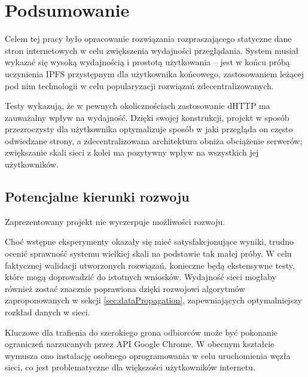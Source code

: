 \chapter{Podsumowanie}
\label{cha:summary}

Celem tej pracy było opracowanie rozwiązania rozpraszającego statyczne dane stron internetowych w celu zwiększenia wydajności przeglądania. System musiał wykazać się wysoką wydajnością i prostotą użytkowania -- jest w końcu próbą uczynienia IPFS przystępnym dla użytkownika końcowego, zastosowaniem leżącej pod nim technologii w celu popularyzacji rozwiązań zdecentralizowanych.

Testy wykazują, że w pewnych okolicznościach zastosowanie dHTTP ma zauważalny wpływ na wydajność. Dzięki swojej konstrukcji, projekt w sposób przezroczysty dla użytkownika optymalizuje sposób w jaki przegląda on często odwiedzane strony, a zdecentralizowana architektura obniża obciążenie serwerów; zwiększanie skali sieci z kolei ma pozytywny wpływ na wszystkich jej użytkowników.

\section{Potencjalne kierunki rozwoju}
\label{sec:future}

Zaprezentowany projekt nie wyczerpuje możliwości rozwoju.

Choć wstępne eksperymenty okazały się mieć satysfakcjonujące wyniki, trudno ocenić  sprawność systemu wielkiej skali na podstawie tak małej próby. W celu faktycznej walidacji utworzonych rozwiązań, konieczne będą ekstensywne testy, które mogą doprowadzić do istotnych wniosków. Wydajność sieci mogłaby również zostać znacznie poprawiona dzięki rozwojowi algorytmów zaproponowanych w sekcji \ref{sec:dataPropagation}, zapewniających optymalniejszy rozkład danych w sieci.

Kluczowe dla trafienia do szerokiego grona odbiorców może być pokonanie ograniczeń narzucanych przez API Google Chrome. W obecnym kształcie wymusza ono instalację osobnego oprogramowania w celu uruchomienia węzła sieci, co jest problematyczne dla większości użytkowników internetu.